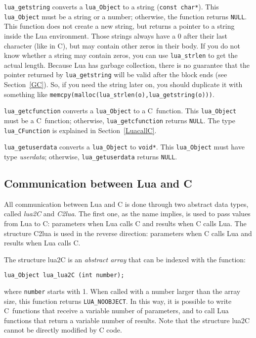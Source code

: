 \documentclass[11pt]{article}
\newcommand{\See}[1]{Section~\ref{#1}}
\newcommand{\see}[1]{(see \See{#1})}
\newcommand{\Def}[1]{\emph{#1}\index{#1}}
\newcommand{\Deffunc}[1]{\index{#1}}
\begin{document}
\verb|lua_getstring| converts a \verb|lua_Object| to a string
(\verb|const char*|).
This \verb|lua_Object| must be a string or a number;
otherwise, the function returns \verb|NULL|.
This function does not create a new string,
but returns a pointer to a string inside the Lua environment.
Those strings always have a 0 after their last character (like in C),
but may contain other zeros in their body.
If you do not know whether a string may contain zeros,
you can use \verb|lua_strlen| to get the actual length.
Because Lua has garbage collection,
there is no guarantee that the pointer returned by \verb|lua_getstring|
will be valid after the block ends
\see{GC}.
So,
if you need the string later on,
you should duplicate it with something like
\verb|memcpy(malloc(lua_strlen(o),lua_getstring(o)))|.

\verb|lua_getcfunction| converts a \verb|lua_Object| to a C~function.
This \verb|lua_Object| must be a C~function;
otherwise, \verb|lua_getcfunction| returns \verb|NULL|.
The type \verb|lua_CFunction| is explained in \See{LuacallC}.

\verb|lua_getuserdata| converts a \verb|lua_Object| to \verb|void*|.
This \verb|lua_Object| must have type \emph{userdata};
otherwise, \verb|lua_getuserdata| returns \verb|NULL|.

\subsection{Communication between Lua and C}\label{Lua-C-protocol}

All communication between Lua and C is done through two
abstract data types, called \Def{lua2C} and \Def{C2lua}.
The first one, as the name implies, is used to pass values
from Lua to C:
parameters when Lua calls C and results when C calls Lua.
The structure C2lua is used in the reverse direction:
parameters when C calls Lua and results when Lua calls C.

The structure lua2C is an \emph{abstract array}
that can be indexed with the function:
\Deffunc{lua_lua2C}
\begin{verbatim}
lua_Object lua_lua2C (int number);
\end{verbatim}
where \verb|number| starts with 1.
When called with a number larger than the array size,
this function returns \verb|LUA_NOOBJECT|\Deffunc{LUA_NOOBJECT}.
In this way, it is possible to write C~functions that receive
a variable number of parameters,
and to call Lua functions that return a variable number of results.
Note that the structure lua2C cannot be directly modified by C code.
\end{document}
